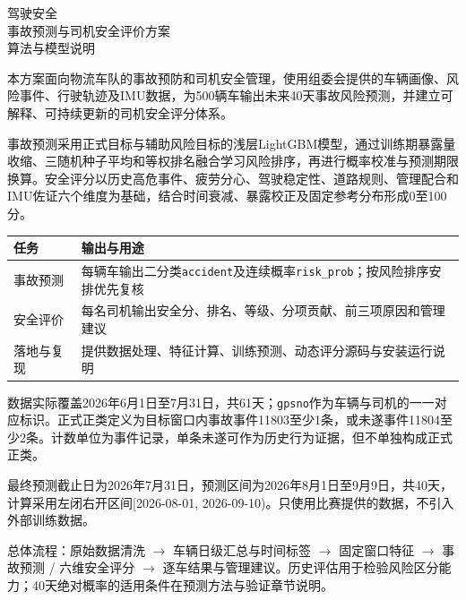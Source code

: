 \documentclass[UTF8,10pt]{ctexart}
\newcommand{\hdr}[1]{\par\vspace{0.4em}{\large\heiti\color{heading}#1}\par\vspace{0.4em}}
\newcommand{\thead}[1]{\textbf{\color{heading}#1}}
\begin{document}
\begin{center}
{\fontsize{23}{32}\selectfont\heiti\color{heading}驾驶安全}\\[0.4em]
{\fontsize{23}{32}\selectfont\heiti\color{heading}事故预测与司机安全评价方案}\\[0.9em]
{\large\heiti\color{heading} \;\textperiodcentered\; 算法与模型说明}
\end{center}

\vspace{1.2em}

\hdr{方案概述}

本方案面向物流车队的事故预防和司机安全管理，使用组委会提供的车辆画像、风险事件、行驶轨迹及IMU数据，为500辆车输出未来40天事故风险预测，并建立可解释、可持续更新的司机安全评分体系。

事故预测采用正式目标与辅助风险目标的浅层LightGBM模型，通过训练期暴露量收缩、三随机种子平均和等权排名融合学习风险排序，再进行概率校准与预测期限换算。安全评分以历史高危事件、疲劳分心、驾驶稳定性、道路规则、管理配合和IMU佐证六个维度为基础，结合时间衰减、暴露校正及固定参考分布形成0至100分。

\begin{center}\small
{}
\begin{tabularx}{\textwidth}{p{3.2cm} Y}
\thead{任务} & \thead{输出与用途} \\
\hline
事故预测 & 每辆车输出二分类\texttt{accident}及连续概率\texttt{risk\_prob}；按风险排序安排优先复核 \\
\hline
安全评价 & 每名司机输出安全分、排名、等级、分项贡献、前三项原因和管理建议 \\
\hline
落地与复现 & 提供数据处理、特征计算、训练预测、动态评分源码与安装运行说明 \\
\hline
\end{tabularx}
\end{center}

\hdr{样本与目标定义}

数据实际覆盖2026年6月1日至7月31日，共61天；\texttt{gpsno}作为车辆与司机的一一对应标识。正式正类定义为目标窗口内事故事件11803至少1条，或未遂事件11804至少2条。计数单位为事件记录，单条未遂可作为历史行为证据，但不单独构成正式正类。

最终预测截止日为2026年7月31日，预测区间为2026年8月1日至9月9日，共40天，计算采用左闭右开区间[2026-08-01, 2026-09-10)。只使用比赛提供的数据，不引入外部训练数据。

{总体流程：原始数据清洗 $\rightarrow$ 车辆日级汇总与时间标签 $\rightarrow$ 固定窗口特征 $\rightarrow$ 事故预测 / 六维安全评分 $\rightarrow$ 逐车结果与管理建议。历史评估用于检验风险区分能力；40天绝对概率的适用条件在预测方法与验证章节说明。}
\end{document}
